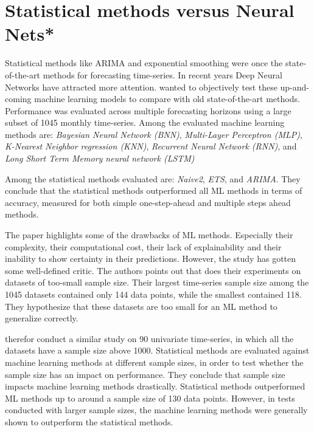 \section{Statistical methods versus Neural Nets*}
\label{section:RelatedWork:Statistical-NN}

Statistical methods like ARIMA and exponential smoothing were once the state-of-the-art methods for forecasting time-series.
In recent years Deep Neural Networks have attracted more attention.
\cite{Makridakis2018} wanted to objectively test these up-and-coming machine learning models to compare with old state-of-the-art methods.
Performance was evaluated across multiple forecasting horizons using a large subset of 1045 monthly time-series.
Among the evaluated machine learning methods are:
\textit{Bayesian Neural Network (BNN)},
\textit{Multi-Layer Perceptron (MLP)},
\textit{K-Nearest Neighbor regression (KNN)},
\textit{Recurrent Neural Network (RNN)}, and
\textit{Long Short Term Memory neural network (LSTM)}


Among the statistical methods evaluated are:
\textit{Naive2},
\textit{ETS}, and
\textit{ARIMA}.
They conclude that the statistical methods outperformed all ML methods in terms of accuracy, measured for both
simple one-step-ahead and multiple steps ahead methods.

The paper \cite{Makridakis2018} highlights some of the drawbacks of ML methods. Especially their complexity, their computational cost,
their lack of explainability and their inability to show certainty in their predictions.
However, the study has gotten some well-defined critic. The authors \citeauthor*{Cerqueira2019} points
out that \cite{Makridakis2018} does their experiments on datasets of too-small sample size.
Their largest time-series sample size among the 1045 datasets contained only 144 data points, while the smallest contained 118.
They hypothesize that these datasets are too small for an ML method to generalize correctly.

\cite{Cerqueira2019} therefor conduct a similar study on 90 univariate time-series, in which
all the datasets have a sample size above 1000.
Statistical methods are evaluated against machine learning methods at different sample sizes,
in order to test whether the sample size has an impact on performance.
They conclude that sample size impacts machine learning methods drastically.
Statistical methods outperformed ML methods up to around a sample size of 130 data points.
However, in tests conducted with larger sample sizes, the machine learning methods were generally shown to outperform the statistical methods.

